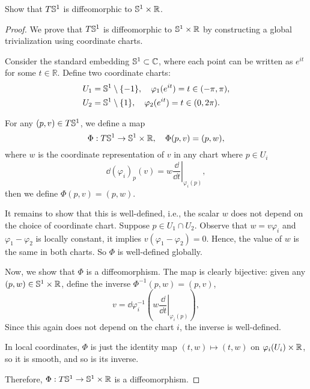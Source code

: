 \begin{problem}
    Show that $T\mathbb{S}^1$ is diffeomorphic to $\mathbb{S}^1 \times \mathbb{R}$.
\begin{proof}
    We prove that \(T\mathbb{S}^1\) is diffeomorphic to \(\mathbb{S}^1 \times \mathbb{R}\) by constructing a global trivialization using coordinate charts.

    Consider the standard embedding \(\mathbb{S}^1 \subset \mathbb{C}\), where each point can be written as \(e^{it}\) for some \(t \in \mathbb{R}\). Define two coordinate charts:
    \begin{align*}
        U_1 &= \mathbb{S}^1 \setminus \{ -1 \},  \quad \varphi_1(e^{it}) = t \in (-\pi, \pi), \\
        U_2 &= \mathbb{S}^1 \setminus \{ 1 \},  \quad \varphi_2(e^{it}) = t \in (0, 2\pi).
    \end{align*}

    For any \((p, v) \in T\mathbb{S}^1\), we define a map
    \[
        \Phi: T\mathbb{S}^1 \to \mathbb{S}^1 \times \mathbb{R}, \quad \Phi(p, v) = (p, w),
    \]
    where \(w\) is the coordinate representation of \(v\) in any chart where \(p \in U_i\)
    \[
        \dd(\varphi_i)_p(v) = w \left. \frac{\dd}{\dd{t}} \right|_{\varphi_i(p)},
    \]
    then we define \(\Phi(p, v) = (p, w)\).

    It remains to show that this is well-defined, i.e., the scalar \(w\) does not depend on the choice of coordinate chart. Suppose \(p \in U_1 \cap U_2\). Observe that $w = v \varphi_i$ and $\varphi_1 - \varphi_2$ is locally constant, it implies $v(\varphi_1-\varphi_2)=0$.
    Hence, the value of \(w\) is the same in both charts. So \(\Phi\) is well-defined globally.

    Now, we show that \(\Phi\) is a diffeomorphism. The map is clearly bijective: given any \((p, w) \in \mathbb{S}^1 \times \mathbb{R}\), define the inverse \(\Phi^{-1}(p, w) = (p, v)\), 
    \[
        v = \dd\varphi_i^{-1}\left(w \left. \frac{\dd}{\dd{t}} \right|_{\varphi_i(p)}\right),
    \]
    Since this again does not depend on the chart \(i\), the inverse is well-defined.

    In local coordinates, \(\Phi\) is just the identity map \((t, w) \mapsto (t, w)\) on \(\varphi_i(U_i) \times \mathbb{R}\), so it is smooth, and so is its inverse.

    Therefore, \(\Phi: T\mathbb{S}^1 \to \mathbb{S}^1 \times \mathbb{R}\) is a diffeomorphism.
\end{proof}
\end{problem}

